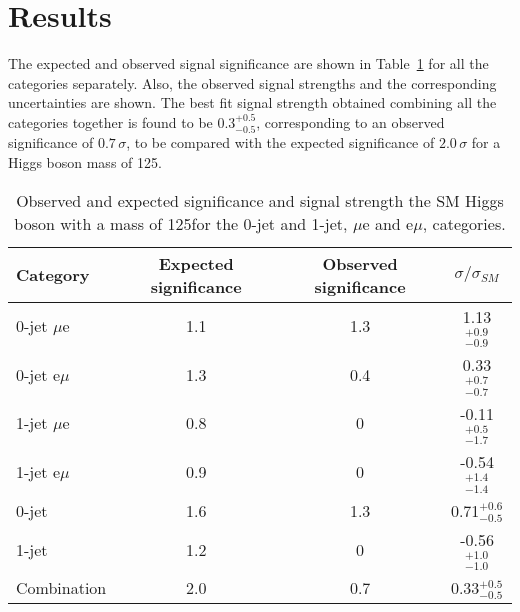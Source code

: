 \section{Results}\label{chap5:results}

The expected and observed signal significance are shown in Table~\ref{tab:13TeVsignif} for all the categories separately. Also, the observed signal strengths and the corresponding uncertainties are shown. The best fit signal strength obtained combining all the categories together is found to be $0.3^{+0.5}_{-0.5}$, corresponding to an observed significance of $0.7\,\sigma$, to be compared with the expected significance of $2.0\,\sigma$ for a Higgs boson mass of 125\GeV.

\begin{table}
\caption{Observed and expected significance and signal strength  the SM Higgs boson with a mass of 125\GeV for the 0-jet and 1-jet, $\mu$e and e$\mu$, categories.}\label{tab:13TeVsignif}
\begin{center}
\begin{tabular}{lccc}
\toprule
Category  &  Expected significance      &  Observed  significance    &  $\sigma/\sigma_{SM}$     \\
\midrule
0-jet  $\mu$e   &     1.1        &  1.3        &  1.13 $_{-0.9}^{+0.9}$             \\ [5pt]   

0-jet  e$\mu$   &     1.3        &  0.4        &  0.33 $_{-0.7}^{+0.7}$             \\ [5pt]   

1-jet  $\mu$e   &     0.8        &  0          &  -0.11$_{-1.7}^{+0.5}$                 \\ [5pt] 

1-jet  e$\mu$   &     0.9        &  0          &  -0.54$_{-1.4}^{+1.4}$                 \\ [5pt] 

\midrule 

0-jet           &     1.6        &  1.3       &  0.71$_{-0.5}^{+0.6}$             \\ [5pt]  

1-jet           &     1.2        &  0         &  -0.56$_{-1.0}^{+1.0}$                \\ [5pt]  

\midrule 
Combination     &     2.0        &  0.7       &  0.33$_{-0.5}^{+0.5}$              \\ [5pt]  
\bottomrule
\end{tabular}
\end{center}
\end{table}

